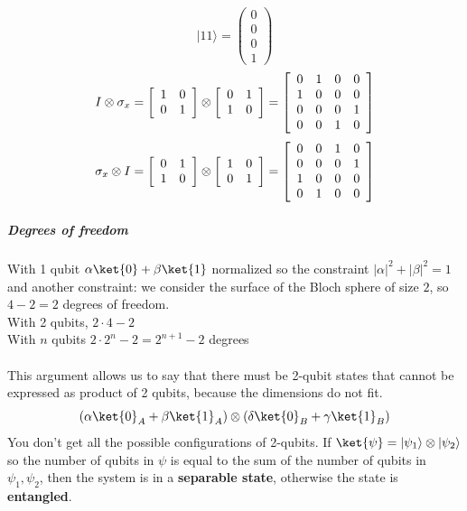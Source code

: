 \documentclass[10pt]{report}
\begin{document}
$$|11\rangle = \left(\begin{array}{c}
0\\0\\0\\1
\end{array}\right)$$
$$I\otimes\sigma_x = \left[\begin{array}{c c}
1&0\\0&1
\end{array}\right]\otimes\left[\begin{array}{c c}
0&1\\1&0
\end{array}\right] = \left[\begin{array}{c c c c}
0&1&0&0\\
1&0&0&0\\
0&0&0&1\\
0&0&1&0
\end{array}\right]$$
$$\sigma_x\otimes I = \left[\begin{array}{c c}
0&1\\1&0
\end{array}\right]\otimes\left[\begin{array}{c c}
1&0\\0&1
\end{array}\right] = \left[\begin{array}{c c c c}
0&0&1&0\\
0&0&0&1\\
1&0&0&0\\
0&1&0&0
\end{array}\right]$$
\subparagraph{Degrees of freedom} With 1 qubit $\alpha\ket{0}+\beta\ket{1}$ normalized so the constraint $|\alpha|^2+|\beta|^2 = 1$ and another constraint: we consider the surface of the Bloch sphere of size $2$, so $4-2 = 2$ degrees of freedom.\\
With 2 qubits, $2\cdot4-2$\\
With $n$ qubits $2\cdot 2^n - 2 = 2^{n+1}-2$ degrees\\\\
This argument allows us to say that there must be 2-qubit states that cannot be expressed as product of 2 qubits, because the dimensions do not fit.
$$(\alpha\ket{0}_A+\beta\ket{1}_A)\otimes(\delta\ket{0}_B+\gamma\ket{1}_B)$$
You don't get all the possible configurations of 2-qubits. If $\ket{\psi} = |\psi_1\rangle\otimes|\psi_2\rangle$ so the number of qubits in $\psi$ is equal to the sum of the number of qubits in $\psi_1,\psi_2$, then the system is in a \textbf{separable state}, otherwise the state is \textbf{entangled}.\\
\end{document}
